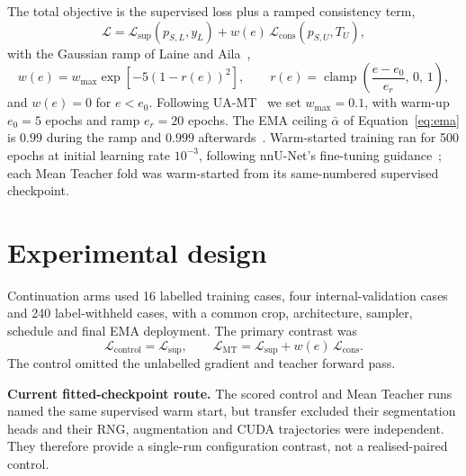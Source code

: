 The total objective is the supervised loss plus a ramped consistency term,
\begin{equation}
  \mathcal{L}=\mathcal{L}_{\mathrm{sup}}\!\left(p_{S,L},y_L\right)
  +w(e)\,\mathcal{L}_{\mathrm{cons}}\!\left(p_{S,U},T_U\right),
  \label{eq:total}
\end{equation}
with the Gaussian ramp of Laine and Aila~\cite{laine2017temporal},
\begin{equation}
  w(e)=w_{\max}\exp\!\left[-5\left(1-r(e)\right)^{2}\right],
  \qquad
  r(e)=\operatorname{clamp}\!\left(\frac{e-e_0}{e_r},\,0,\,1\right),
  \label{eq:ramp}
\end{equation}
and $w(e)=0$ for $e<e_0$. Following UA-MT~\cite{yu2019uamt} we set $w_{\max}=0.1$, with warm-up
$e_0=5$ epochs and ramp $e_r=20$ epochs. The EMA ceiling $\bar{\alpha}$ of
Equation~\eqref{eq:ema} is $0.99$ during the ramp and $0.999$
afterwards~\cite{tarvainen2017mean}. Warm-started training ran for 500 epochs at initial
learning rate $10^{-3}$, following nnU-Net's fine-tuning
guidance~\cite{nnunetdocs_finetuning,wald2024maepretraining}; each Mean Teacher fold was
warm-started from its same-numbered supervised checkpoint.

\section{Experimental design}
\label{sec:experimental-design}

Continuation arms used 16 labelled training cases, four internal-validation cases and 240
label-withheld cases, with a common crop, architecture, sampler, schedule and final EMA
deployment. The primary contrast was
\begin{equation}
  \mathcal{L}_{\mathrm{control}}=\mathcal{L}_{\mathrm{sup}},
  \qquad
  \mathcal{L}_{\mathrm{MT}}=\mathcal{L}_{\mathrm{sup}}+w(e)\,\mathcal{L}_{\mathrm{cons}}.
  \label{eq:contrast}
\end{equation}
The control omitted the unlabelled gradient and teacher forward pass.

\ifshowcurrentcontrol
\begin{currentcontrolroute}
\noindent\textbf{Current fitted-checkpoint route.}
The scored control and Mean Teacher runs named the same supervised warm start, but transfer
excluded their segmentation heads and their RNG, augmentation and CUDA trajectories were
independent. They therefore provide a single-run configuration contrast, not a realised-paired
control.
\end{currentcontrolroute}
\fi

